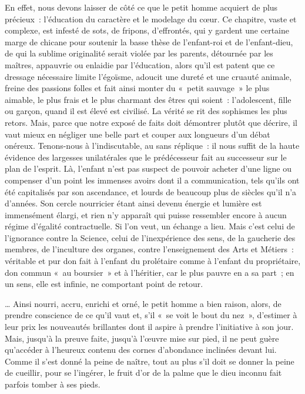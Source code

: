 \documentclass[french,twoside]{book} %
\begin{document}
En effet, nous devons laisser de côté ce que le petit homme acquiert de plus précieux : l’éducation du caractère et le modelage du cœur. Ce chapitre, vaste et complexe, est infesté de sots, de fripons, d’effrontés, qui y gardent une certaine marge de chicane pour soutenir la basse thèse de l’enfant-roi et de l’enfant-dieu, de qui la sublime originalité serait violée par les parents, détournée par les maîtres, appauvrie ou enlaidie par l’éducation, alors qu’il est patent que ce dressage nécessaire limite l’égoïsme, adoucit une dureté et une cruauté animale, freine des passions folles et fait ainsi monter du « petit sauvage » le plus aimable, le plus frais et le plus charmant des êtres qui soient : l’adolescent, fille ou garçon, quand il est élevé est civilisé. La vérité se rit des sophismes les plus retors. Mais, parce que notre exposé de faits doit démontrer plutôt que décrire, il vaut mieux en négliger une belle part et couper aux longueurs d’un débat onéreux. Tenons-nous à l’indiscutable, au sans réplique : il nous suffit de la haute évidence des largesses unilatérales que le prédécesseur fait au successeur sur le plan de l’esprit. Là, l’enfant n’est pas suspect de pouvoir acheter d’une ligne ou compenser d’un point les immenses avoirs dont il a communication, tels qu’ils ont été capitalisés par son ascendance, et lourds de beaucoup plus de siècles qu’il n’a d’années. Son cercle nourricier étant ainsi devenu énergie et lumière est immensément élargi, et rien n’y apparaît qui puisse ressembler encore à aucun régime d’égalité contractuelle. Si l’on veut, un échange a lieu. Mais c’est celui de l’ignorance contre la Science, celui de l’inexpérience des sens, de la gaucherie des membres, de l’inculture des organes, contre l’enseignement des Arts et Métiers : véritable et pur don fait à l’enfant du prolétaire comme à l’enfant du propriétaire, don commun « au boursier » et à l’héritier, car le plus pauvre en a sa part ; en un sens, elle est infinie, ne comportant point de retour.\par
… Ainsi nourri, accru, enrichi et orné, le petit homme a bien raison, alors, de prendre conscience de ce qu’il vaut et, s’il « se voit le bout du nez », d’estimer à leur prix les nouveautés brillantes dont il aspire à prendre l’initiative à son jour. Mais, jusqu’à la preuve faite, jusqu’à l’œuvre mise sur pied, il ne peut guère qu’accéder à l’heureux contenu des cornes d’abondance inclinées devant lui. Comme il s’est donné la peine de naître, tout au plus s’il doit se donner la peine de cueillir, pour se l’ingérer, le fruit d’or de la palme que le dieu inconnu fait parfois tomber à ses pieds.
\end{document}
